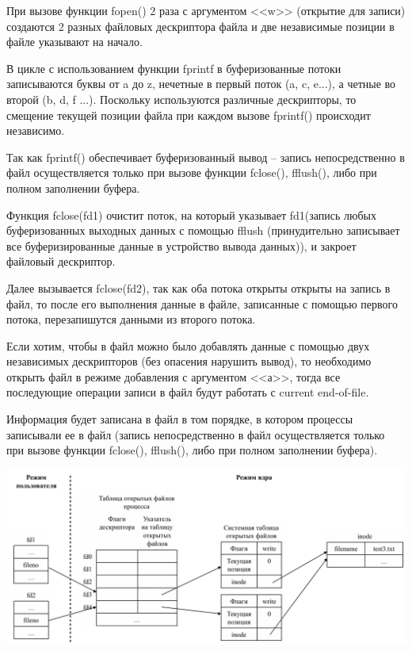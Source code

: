 \documentclass[a4paper,14pt]{extreport} %
\begin{document}
При вызове функции fopen() 2 раза с аргументом <<w>> (открытие для записи) создаются 2 разных файловых дескриптора файла и две независимые позиции в файле указывают на начало. 

В цикле с использованием функции fprintf в буферизованные потоки записываются буквы от a до z, нечетные в первый поток (a, c, e...), а четные во второй (b, d, f ...). Поскольку используются различные дескрипторы, то смещение текущей позиции файла при каждом вызове fprintf() происходит независимо.

Так как fprintf() обеспечивает буферизованный вывод -- запись непосредственно в файл осуществляется только при вызове функции fclose(), fflush(), либо при полном заполнении буфера.

Функция fclose(fd1) очистит поток, на который указывает fd1(запись любых буферизованных выходных данных с помощью fflush (принудительно записывает все буферизированные данные в устройство вывода данных)), и закроет файловый дескриптор.

Далее вызывается fclose(fd2), так как оба потока открыты открыты на запись в файл, то после его выполнения данные в файле, записанные с помощью первого потока, перезапишутся данными из второго потока. 

\hfill

Если хотим, чтобы в файл можно было добавлять данные с помощью двух независимых дескрипторов (без опасения нарушить вывод), то необходимо открыть файл в режиме добавления с аргументом <<а>>, тогда все последующие операции записи в файл будут работать с current end-of-file. 

Информация будет записана в файл в том порядке, в котором процессы записывали ее в файл (запись непосредственно в файл осуществляется только при вызове функции fclose(), fflush(), либо при полном заполнении буфера).

\includegraphics[scale=0.6]{shema3}

\newpage
\end{document}

